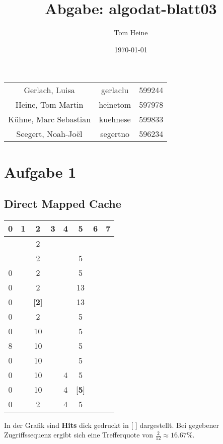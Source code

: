 \documentclass[12pt,a4paper]{scrartcl}
\author{Tom Heine}
\title{Abgabe: algodat-blatt03}
\date{\today}
\begin{document}
	\newpage
	\begin{center}
		\begin{tabular}{ccc}
			Gerlach, Luisa&gerlaclu&599244\\
			Heine, Tom Martin&heinetom&597978\\
			Kühne, Marc Sebastian&kuehnese&599833\\
			Seegert, Noah-Joël&segertno&596234
		\end{tabular}
	\end{center}
	\section*{Aufgabe 1}
		\subsection*{Direct Mapped Cache}
		\begin{longtable}{|cccccccc|}
			\hline
			0&1&2&3&4&5&6&7\\
			\hline
			&&2&&&&&\\
			\hline
			&&2&&&5&&\\
			\hline
			0&&2&&&5&&\\
			\hline
			0&&2&&&13&&\\
			\hline
			0&&[\textbf{2}]&&&13&&\\
			\hline
			0&&2&&&5&&\\
			\hline
			0&&10&&&5&&\\
			\hline
			8&&10&&&5&&\\
			\hline
			0&&10&&&5&&\\
			\hline
			0&&10&&4&5&&\\
			\hline
			0&&10&&4&[\textbf{5}]&&\\
			\hline
			0&&2&&4&5&&\\
			\hline 
		\end{longtable}
		In der Grafik sind \textbf{Hits} dick gedruckt in [ ] dargestellt.
		Bei gegebener Zugriffssequenz ergibt sich eine Trefferquote von \(\frac{2}{12} \approx 16.67\% \).
		
\end{document}
